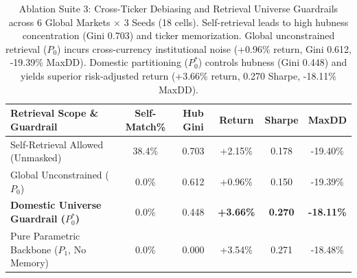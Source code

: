 \begin{table}[ht]
\centering
\small
\begin{tabular}{lccccc}
\toprule
\textbf{Retrieval Scope \& Guardrail} & \textbf{Self-Match\%} & \textbf{Hub Gini} & \textbf{Return} & \textbf{Sharpe} & \textbf{MaxDD} \\
\midrule
Self-Retrieval Allowed (Unmasked) & 38.4\% & 0.703 & +2.15\% & 0.178 & -19.40\% \\
Global Unconstrained ($P_0$) & 0.0\% & 0.612 & +0.96\% & 0.150 & -19.39\% \\
\textbf{Domestic Universe Guardrail ($P_0^*$)} & 0.0\% & 0.448 & \textbf{+3.66\%} & \textbf{0.270} & \textbf{-18.11\%} \\
Pure Parametric Backbone ($P_1$, No Memory) & 0.0\% & 0.000 & +3.54\% & 0.271 & -18.48\% \\
\bottomrule
\end{tabular}
\caption{Ablation Suite 3: Cross-Ticker Debiasing and Retrieval Universe Guardrails across 6 Global Markets $\times$ 3 Seeds (18 cells). Self-retrieval leads to high hubness concentration (Gini 0.703) and ticker memorization. Global unconstrained retrieval ($P_0$) incurs cross-currency institutional noise (+0.96\% return, Gini 0.612, -19.39\% MaxDD). Domestic partitioning ($P_0^*$) controls hubness (Gini 0.448) and yields superior risk-adjusted return (+3.66\% return, 0.270 Sharpe, -18.11\% MaxDD).}
\label{tab:ablation_suite_3_cross_ticker_guardrails}
\end{table}

